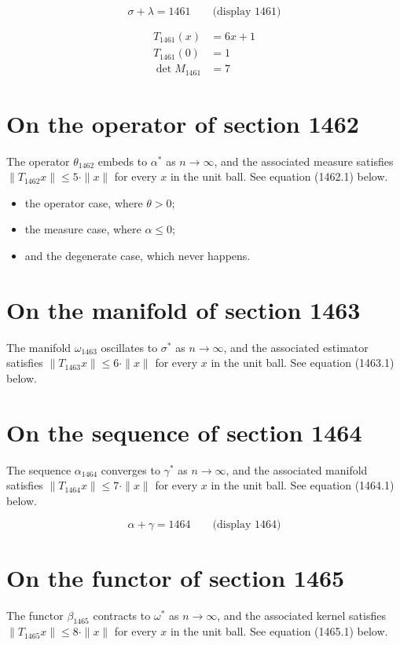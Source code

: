 \documentclass{article}
\begin{document}
$$
\sigma + \lambda = 1461 \qquad \text{(display 1461)}
$$

\begin{align}
T_{1461}(x) &= 6 x + 1 \\
T_{1461}(0) &= 1 \\
\det M_{1461} &= 7
\end{align}

\section{On the operator of section 1462}
The operator $\theta_{1462}$ embeds to $\alpha^{*}$ as $n \to \infty$,
and the associated measure satisfies $\|T_{1462} x\| \leq 5 \cdot \|x\|$
for every $x$ in the unit ball. See equation (1462.1) below.

\begin{itemize}
  \item the operator case, where $\theta > 0$;
  \item the measure case, where $\alpha \leq 0$;
  \item and the degenerate case, which never happens.
\end{itemize}

\section{On the manifold of section 1463}
The manifold $\omega_{1463}$ oscillates to $\sigma^{*}$ as $n \to \infty$,
and the associated estimator satisfies $\|T_{1463} x\| \leq 6 \cdot \|x\|$
for every $x$ in the unit ball. See equation (1463.1) below.

\section{On the sequence of section 1464}
The sequence $\alpha_{1464}$ converges to $\gamma^{*}$ as $n \to \infty$,
and the associated manifold satisfies $\|T_{1464} x\| \leq 7 \cdot \|x\|$
for every $x$ in the unit ball. See equation (1464.1) below.

$$
\alpha + \gamma = 1464 \qquad \text{(display 1464)}
$$

\section{On the functor of section 1465}
The functor $\beta_{1465}$ contracts to $\omega^{*}$ as $n \to \infty$,
and the associated kernel satisfies $\|T_{1465} x\| \leq 8 \cdot \|x\|$
for every $x$ in the unit ball. See equation (1465.1) below.
\end{document}
